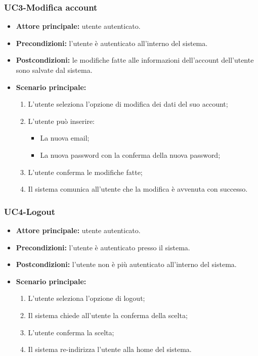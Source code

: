 
\subsubsection{UC3-Modifica account }
\begin{itemize}
    \item \textbf{Attore principale:} utente autenticato.
    \item \textbf{Precondizioni:} l'utente è autenticato all'interno del sistema.
    \item \textbf{Postcondizioni:} le modifiche fatte alle informazioni dell'account dell'utente sono
    salvate dal sistema.
    \item \textbf{Scenario principale:}
        \begin{enumerate}
            \item L'utente seleziona l'opzione di modifica dei dati del suo account;
            \item L'utente può inserire:
              \begin{itemize}
                \item La nuova email;
                \item La nuova password con la conferma della nuova password;
              \end{itemize}
            \item L'utente conferma le modifiche fatte;
            \item Il sistema comunica all'utente che la modifica è avvenuta con successo.
        \end{enumerate}
\end{itemize}

\subsubsection{UC4-Logout}
\begin{itemize}
    \item \textbf{Attore principale:} utente autenticato.
    \item \textbf{Precondizioni:} l'utente è autenticato presso il sistema.
    \item \textbf{Postcondizioni:} l'utente non è più autenticato all'interno del sistema.
    \item \textbf{Scenario principale:}
    \begin{enumerate}
        \item L'utente seleziona l'opzione di logout;
        \item Il sistema chiede all'utente la conferma della scelta;
        \item L'utente conferma la scelta;
        \item Il sistema re-indirizza l'utente alla home del sistema.
    \end{enumerate}
\end{itemize}

